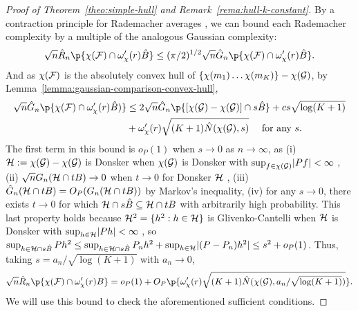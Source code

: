 \begin{proof}[Proof of Theorem~\ref{theo:simple-hull} and Remark~\ref{rema:hull-k-constant}]
By a contraction principle for Rademacher averages \citep[Lemma 4.5]{ledoux1991probability}, 
we can bound each Rademacher complexity by a multiple of the analogous Gaussian complexity:
\[ \sqrt{n}\hat R_n\p{\chi(\F) \cap \omega'_{\chi}(r) \hat B} \le (\pi/2)^{1/2} \sqrt{n}\hat G_n\p{\chi(\F) \cap \omega'_{\chi}(r) \hat B}. \] 
And as  $\chi(\mathcal{F})$ is the absolutely convex hull of $\{\chi(m_1) \ldots \chi(m_K)\} - \chi(\mathcal{G})$,
by Lemma~\ref{lemma:gaussian-comparison-convex-hull}, 
\begin{align*} \sqrt{n}\hat G_n\p{\chi(\F) \cap \omega_{\chi}'(r) \hat B)} 
&\le 2\sqrt{n}\hat G_n\p{[\chi(\GG)-\chi(\GG)] \cap s \hat B} 
+ c s \sqrt{\log(K+1)}  \\
&+ \omega_{\chi}'(r) \sqrt{(K+1)\hat N(\chi(\GG), s)} \quad \text{ for any } s. 
\end{align*}
 The first term in this bound is $o_P(1)$ when $s \to 0$ as $n \to \infty$, 
as (i) $\mathcal{H} := \chi(\mathcal{G}) - \chi(\mathcal{G})$ is Donsker when $\chi(\mathcal{G})$ is Donsker with $\sup_{f \in \chi(\GG)}\abs{\P f} < \infty$ \citep[Example 2.10.7]{vandervaart-wellner1996:weak-convergence},
(ii) $\sqrt{n}G_n(\mathcal{H} \cap t B) \to 0$ 
when $t \to 0$  for Donsker $\mathcal{H}$ \citep[e.g.,][Theorem 14.6]{ledoux1991probability},
(iii) $\hat G_n(\mathcal{H} \cap t B) = O_P(G_n(\mathcal{H} \cap t B))$ by Markov's inequality,
(iv) for any $s \to 0$, there exists $t \to 0$ for which
    $\mathcal{H} \cap s \hat B \subseteq \mathcal{H} \cap t B$ with arbitrarily high probability. This last property
holds because $\mathcal{H}^2 = \{h^2 : h \in \mathcal{H}\}$ is Glivenko-Cantelli when $\mathcal{H}$ is Donsker with $\sup_{h\in\HH}\abs{\P h} < \infty$ \citep[Lemma 2.10.14]{vandervaart-wellner1996:weak-convergence}, so $\sup_{h \in \HH \cap s \hat B} \P h^2 \le \sup_{h \in \HH \cap s \hat B} \Pn h^2 + \sup_{h \in \HH}\abs{(\P - \Pn)h^2} \le s^2 + o_P(1)$.
Thus, taking $s=a_n/\sqrt{\log(K+1)}$ with $a_n \to 0$,
\[  \sqrt{n}\hat R_n\p{\chi(\F) \cap \omega'_{\chi}(r) B} = o_P(1) + O_P\p{\omega_{\chi}'(r) \sqrt{(K+1)\hat N(\chi(\GG), a_n/\sqrt{\log(K+1)})}}. \]
We will use this bound to check the aforementioned sufficient conditions. 


\end{proof}
